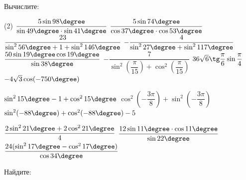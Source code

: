 \begin{class}[number=3]
	\begin{listofex}
		\item Вычислите:
		\begin{tasks}(2)
			\task \( \dfrac{ 5\sin 98 \degree }{ \sin 49\degree \cdot \sin 41\degree } \)
			\task \( \dfrac{ 5\sin 74 \degree }{ \cos 37 \degree \cdot \cos 53 \degree } \)
			\task \( \dfrac{ 23 }{ \sin^2 56 \degree + 1 + \sin^2 146 \degree } \)
			\task \( -\dfrac{ 4 }{ \sin^2 27 \degree + \sin^2 117 \degree } \)
			\task \( \dfrac{ 50 \sin 19 \degree \cos 19 \degree }{ \sin 38 \degree } \)
			\task \( -\dfrac{ 7 }{ \sin^2 \left( \dfrac{ \pi }{ 15 } \right) + \cos^2 \left( \dfrac{ \pi }{ 15 } \right) } \)
			\task \( 36 \sqrt{6} \tg \dfrac{ \pi }{ 6 } \sin \dfrac{ \pi }{ 4 } \)
			\task \( -4 \sqrt{3} \cos (-750 \degree) \)
			
			\task \( \sin^215\degree-1+\cos^215 \degree \)
			\task \( \cos^2\left( -\dfrac{ 3\pi }{ 8 } \right) +\sin^2\left( -\dfrac{ 3\pi }{ 8 } \right) \)
			\task \( \sin^2 (-88\degree) + \cos^2 (-88\degree) -5 \)
			
			\task \( \dfrac{2\sin^221\degree+2\cos^221\degree}{4} \)
			\task \( \dfrac{ 12\sin 11 \degree \cdot \cos 11 \degree }{ \sin 22 \degree } \)
			\task \( \dfrac{ 24 (\sin^2 17 \degree-\cos^217 \degree) }{ \cos 34 \degree } \)
			
		\end{tasks}
		\item Найдите: %
		\begin{tasks}
			

\end{tasks}
\end{listofex}
\end{class}
